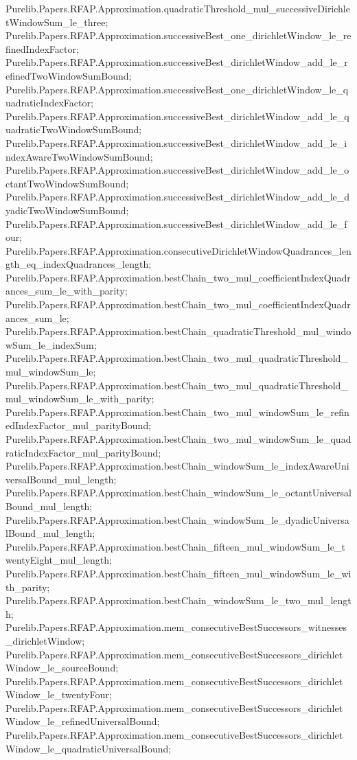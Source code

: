 \documentclass[11pt]{article}
\begin{document}
{Purelib.Papers.RFAP.Approximation.quadraticThreshold_mul_successiveDirichletWindowSum_le_three;
Purelib.Papers.RFAP.Approximation.successiveBest_one_dirichletWindow_le_refinedIndexFactor;
Purelib.Papers.RFAP.Approximation.successiveBest_dirichletWindow_add_le_refinedTwoWindowSumBound;
Purelib.Papers.RFAP.Approximation.successiveBest_one_dirichletWindow_le_quadraticIndexFactor;
Purelib.Papers.RFAP.Approximation.successiveBest_dirichletWindow_add_le_quadraticTwoWindowSumBound;
Purelib.Papers.RFAP.Approximation.successiveBest_dirichletWindow_add_le_indexAwareTwoWindowSumBound;
Purelib.Papers.RFAP.Approximation.successiveBest_dirichletWindow_add_le_octantTwoWindowSumBound;
Purelib.Papers.RFAP.Approximation.successiveBest_dirichletWindow_add_le_dyadicTwoWindowSumBound;
Purelib.Papers.RFAP.Approximation.successiveBest_dirichletWindow_add_le_four;
Purelib.Papers.RFAP.Approximation.consecutiveDirichletWindowQuadrances_length_eq_indexQuadrances_length;
Purelib.Papers.RFAP.Approximation.bestChain_two_mul_coefficientIndexQuadrances_sum_le_with_parity;
Purelib.Papers.RFAP.Approximation.bestChain_two_mul_coefficientIndexQuadrances_sum_le;
Purelib.Papers.RFAP.Approximation.bestChain_quadraticThreshold_mul_windowSum_le_indexSum;
Purelib.Papers.RFAP.Approximation.bestChain_two_mul_quadraticThreshold_mul_windowSum_le;
Purelib.Papers.RFAP.Approximation.bestChain_two_mul_quadraticThreshold_mul_windowSum_le_with_parity;
Purelib.Papers.RFAP.Approximation.bestChain_two_mul_windowSum_le_refinedIndexFactor_mul_parityBound;
Purelib.Papers.RFAP.Approximation.bestChain_two_mul_windowSum_le_quadraticIndexFactor_mul_parityBound;
Purelib.Papers.RFAP.Approximation.bestChain_windowSum_le_indexAwareUniversalBound_mul_length;
Purelib.Papers.RFAP.Approximation.bestChain_windowSum_le_octantUniversalBound_mul_length;
Purelib.Papers.RFAP.Approximation.bestChain_windowSum_le_dyadicUniversalBound_mul_length;
Purelib.Papers.RFAP.Approximation.bestChain_fifteen_mul_windowSum_le_twentyEight_mul_length;
Purelib.Papers.RFAP.Approximation.bestChain_fifteen_mul_windowSum_le_with_parity;
Purelib.Papers.RFAP.Approximation.bestChain_windowSum_le_two_mul_length;
Purelib.Papers.RFAP.Approximation.mem_consecutiveBestSuccessors_witnesses_dirichletWindow;
Purelib.Papers.RFAP.Approximation.mem_consecutiveBestSuccessors_dirichletWindow_le_sourceBound;
Purelib.Papers.RFAP.Approximation.mem_consecutiveBestSuccessors_dirichletWindow_le_twentyFour;
Purelib.Papers.RFAP.Approximation.mem_consecutiveBestSuccessors_dirichletWindow_le_refinedUniversalBound;
Purelib.Papers.RFAP.Approximation.mem_consecutiveBestSuccessors_dirichletWindow_le_quadraticUniversalBound;
}
\end{document}
